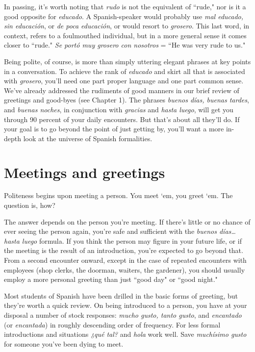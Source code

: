 In passing, it's worth noting that \emph{rudo} is not the equivalent of
``rude," nor is it a good opposite for \emph{educado}. A Spanish-speaker would
probably use \emph{mal educado, sin educación}, or \emph{de poca educación}, or
would resort to \emph{grosero}. This last word, in context, refers to a foulmouthed individual, but in a more general sense it comes closer to
``rude." \emph{Se portó muy grosero con nosotros} = ``He was very rude
to us."

Being polite, of course, is more than simply uttering elegant
phrases at key points in a conversation. To achieve the rank of \emph{educado} and skirt all that is associated with \emph{grosero}, you'll need one part
proper language and one part common sense. We've already addressed
the rudiments of good manners in our brief review of greetings and
good-byes (see Chapter 1). The phrases \emph{buenos días, buenas tardes},
and \emph{buenas noches}, in conjunction with \emph{gracias} and \emph{hasta luego},
will get you through 90 percent of your daily encounters. But that's
about all they'll do. If your goal is to go beyond the point of just getting by, you'll want a more in-depth look at the universe of Spanish
formalities.

\section{Meetings and greetings}

Politeness begins upon meeting a person. You meet `em, you
greet `em. The question is, how?

The answer depends on the person you're meeting. If there's
little or no chance of ever seeing the person again, you're safe and sufficient with the \emph{buenos días\ldots{} hasta luego} formula. If you think the
person may figure in your future life, or if the meeting is the result of
an introduction, you're expected to go beyond that. From a second encounter onward, except in the case of repeated encounters with employees (shop clerks, the doorman, waiters, the gardener), you should
usually employ a more personal greeting than just ``good day" or ``good
night."

Most students of Spanish have been drilled in the basic forms
of greeting, but they're worth a quick review. On being introduced to a
person, you have at your disposal a number of stock responses: \emph{mucho
gusto, tanto gusto}, and \emph{encantado} (or \emph{encantada}) in roughly descending order of frequency. For less formal introductions and situations
\emph{¿qué tal?} and \emph{hola} work well. Save \emph{muchísimo gusto} for someone
you've been dying to meet.

